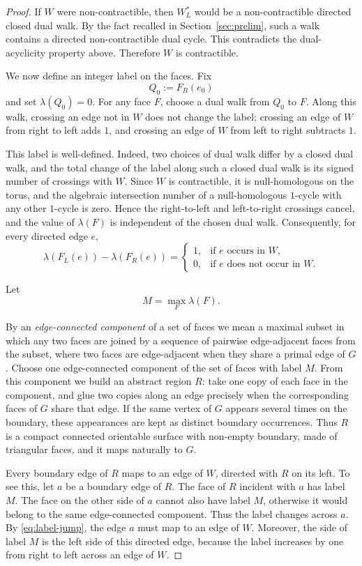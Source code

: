 \documentclass[11pt]{amsart}
\theoremstyle{plain}
\theoremstyle{definition}
\theoremstyle{remark}
\begin{document}
\begin{proof}
If $W$ were non-contractible, then $W_L^*$ would be a non-contractible directed closed dual walk. By the fact recalled in Section~\ref{sec:prelim}, such a walk contains a directed non-contractible dual cycle. This contradicts the dual-acyclicity property above. Therefore $W$ is contractible.

We now define an integer label on the faces. Fix
\[
  Q_0 := F_R(e_0)
\]
and set $\lambda(Q_0) = 0$. For any face $F$, choose a dual walk from $Q_0$ to $F$. Along this walk, crossing an edge not in $W$ does not change the label; crossing an edge of $W$ from right to left adds $1$, and crossing an edge of $W$ from left to right subtracts $1$.

This label is well-defined. Indeed, two choices of dual walk differ by a closed dual walk, and the total change of the label along such a closed dual walk is its signed number of crossings with $W$. Since $W$ is contractible, it is null-homologous on the torus, and the algebraic intersection number of a null-homologous $1$-cycle with any other $1$-cycle is zero. Hence the right-to-left and left-to-right crossings cancel, and the value of $\lambda(F)$ is independent of the chosen dual walk. Consequently, for every directed edge $e$,
\begin{equation}
\label{eq:label-jump}
\lambda(F_L(e)) - \lambda(F_R(e))
=
\begin{cases}
1, & \text{if } e \text{ occurs in } W,\\
0, & \text{if } e \text{ does not occur in } W.
\end{cases}
\end{equation}

Let
\[
  M = \max_F \lambda(F).
\]

By an \emph{edge-connected component} of a set of faces we mean a maximal subset in which any two faces are joined by a sequence of pairwise edge-adjacent faces from the subset, where two faces are edge-adjacent when they share a primal edge of $G$. Choose one edge-connected component of the set of faces with label $M$. From this component we build an abstract region $R$: take one copy of each face in the component, and glue two copies along an edge precisely when the corresponding faces of $G$ share that edge. If the same vertex of $G$ appears several times on the boundary, these appearances are kept as distinct boundary occurrences. Thus $R$ is a compact connected orientable surface with non-empty boundary, made of triangular faces, and it maps naturally to $G$.

Every boundary edge of $R$ maps to an edge of $W$, directed with $R$ on its left. To see this, let $a$ be a boundary edge of $R$. The face of $R$ incident with $a$ has label $M$. The face on the other side of $a$ cannot also have label $M$, otherwise it would belong to the same edge-connected component. Thus the label changes across $a$. By \eqref{eq:label-jump}, the edge $a$ must map to an edge of $W$. Moreover, the side of label $M$ is the left side of this directed edge, because the label increases by one from right to left across an edge of $W$.


\end{proof}
\end{document}
